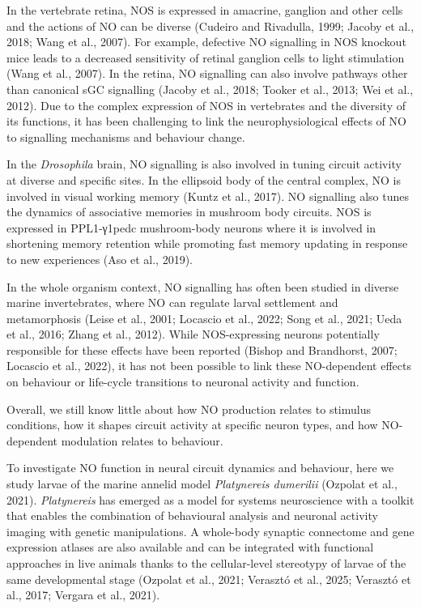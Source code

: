 \documentclass[
  11pt,
  letterpaper,
  DIV=11,
  numbers=noendperiod]{scrartcl}
\begin{document}
In the vertebrate retina, NOS is expressed in amacrine, ganglion and
other cells and the actions of NO can be diverse (Cudeiro and Rivadulla,
1999; Jacoby et al., 2018; Wang et al., 2007). For example, defective NO
signalling in NOS knockout mice leads to a decreased sensitivity of
retinal ganglion cells to light stimulation (Wang et al., 2007). In the
retina, NO signalling can also involve pathways other than canonical sGC
signalling (Jacoby et al., 2018; Tooker et al., 2013; Wei et al., 2012).
Due to the complex expression of NOS in vertebrates and the diversity of
its functions, it has been challenging to link the neurophysiological
effects of NO to signalling mechanisms and behaviour change.

In the \emph{Drosophila} brain, NO signalling is also involved in tuning
circuit activity at diverse and specific sites. In the ellipsoid body of
the central complex, NO is involved in visual working memory (Kuntz et
al., 2017). NO signalling also tunes the dynamics of associative
memories in mushroom body circuits. NOS is expressed in PPL1-γ1pedc
mushroom-body neurons where it is involved in shortening memory
retention while promoting fast memory updating in response to new
experiences (Aso et al., 2019).

In the whole organism context, NO signalling has often been studied in
diverse marine invertebrates, where NO can regulate larval settlement
and metamorphosis (Leise et al., 2001; Locascio et al., 2022; Song et
al., 2021; Ueda et al., 2016; Zhang et al., 2012). While NOS-expressing
neurons potentially responsible for these effects have been reported
(Bishop and Brandhorst, 2007; Locascio et al., 2022), it has not been
possible to link these NO-dependent effects on behaviour or life-cycle
transitions to neuronal activity and function.

Overall, we still know little about how NO production relates to
stimulus conditions, how it shapes circuit activity at specific neuron
types, and how NO-dependent modulation relates to behaviour.

To investigate NO function in neural circuit dynamics and behaviour,
here we study larvae of the marine annelid model \emph{Platynereis
dumerilii} (Ozpolat et al., 2021). \emph{Platynereis} has emerged as a
model for systems neuroscience with a toolkit that enables the
combination of behavioural analysis and neuronal activity imaging with
genetic manipulations. A whole-body synaptic connectome and gene
expression atlases are also available and can be integrated with
functional approaches in live animals thanks to the cellular-level
stereotypy of larvae of the same developmental stage (Ozpolat et al.,
2021; Verasztó et al., 2025; Verasztó et al., 2017; Vergara et al.,
2021).
\end{document}
